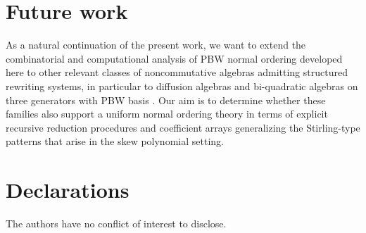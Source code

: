 \documentclass{amsart}
\theoremstyle{definition}
\theoremstyle{remark}
\numberwithin{equation}{section}
\begin{document}
\section{Future work}\label{Futurework}

As a natural continuation of the present work, we want to extend the combinatorial and computational analysis of PBW normal ordering developed here to other relevant classes of noncommutative algebras admitting structured rewriting systems, in particular to diffusion algebras \cite{Hinchcliffe2005, IsaevPyatovRittenberg2001, PyatovTwarock2002, RubianoReyes2026Diffusionalgebras} and bi-quadratic algebras on three generators with PBW basis \cite{Bavula2023, RubianoReyes2026Biquadraticalgebras}. Our aim is to determine whether these families also support a uniform normal ordering theory in terms of explicit recursive reduction procedures and coefficient arrays generalizing the Stirling-type patterns that arise in the skew polynomial setting.


\section{Declarations}

The authors have no conflict of interest to disclose.
\end{document}
